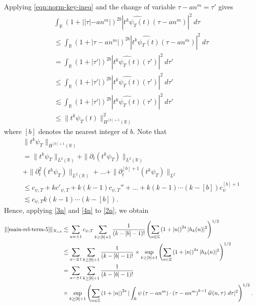 \documentclass[12pt,reqno]{amsart}
\numberwithin{equation}{section}  %
\numberwithin{figure}{section}
\newcommand{\rr}{\mathbb{R}}
\newcommand{\zz}{\mathbb{Z}}
\newcommand{\wh}{\widehat}
\newcommand{\p}{\partial}
\theoremstyle{plain}
\theoremstyle{definition}
\theoremstyle{remark}
\begin{document}
%
%
Applying \eqref{eqn:norm-key-ineq} and the change
of variable $\tau - an^{m } = \tau'$
gives
%
%
\begin{equation}
	\label{3n}
	\begin{split}
		& \int_\rr \left( 1 + | |\tau| - an^{m } | \right)^{2b} | \wh{t^{k}
		\psi_{T}(t)}\left( \tau - an^{m } \right) |^2 \ d \tau
    \\
    & \le \int_\rr \left( 1 + | \tau - an^{m } | \right)^{2b} | \wh{t^{k}
		\psi_{T}(t)}\left( \tau - an^{m } \right) |^2 \ d \tau
		\\
    & = \int_\rr \left( 1 + |\tau'| \right)^{2b} | \wh{t^k \psi_{T}(t)}(\tau') |^2 \
		d \tau'
		\\
    & \le \int_\rr \left( 1 + |\tau'| \right)^{2b} | \wh{t^k \psi_{T}(t)}(\tau')
		|^2 \ d \tau'
		\\
    & \lesssim \int_\rr \left( 1 + | \tau' | \right)^{2b}| \wh{t^{k}
		\psi_{T}(t)}(\tau') |^2 \ d \tau'
		\\
    & \le \|t^k \psi_{T}(t) \|_{H^{[b] + 1}(\rr)}^2
	\end{split}
\end{equation}
%
where $[b]$ denotes the nearest integer of $b$. Note that
%
%
\begin{equation}
	\label{4n}
	\begin{split}
    & \|t^k \psi_{T} \|_{H^{[b] +1}(\rr)}
		\\
    & = \|t^k \psi_{T}\|_{L^2(\rr)} + \|\p_t (t^k \psi_{T} )
    \|_{L^2(\rr)} 
    \\
    & + \| \p_{t}^{2} (t^{k} \psi_{T}) \|_{L^{2}(\rr)} + \ldots + \|
    \p_{t}^{[b] + 1} (t^{k} \psi_{T})\|_{L^{2}}
    \\
    & \le c_{\psi, T} + k c'_{\psi, T} + k (k -1) c_{\psi, T}'' + \ldots +
    k(k-1) \cdots (k - [b]) c_{\psi}^{[b] + 1}
    \\
    & \lesssim c_{\psi, T} k(k-1) \cdots (k - [b]).
	\end{split}
\end{equation}
%
%
Hence, applying \eqref{3n} and \eqref{4n} to \eqref{2n}, we obtain
%
\begin{equation}
	\label{5n}
	\begin{split}
		\|\eqref{main-rel-term-5} \|_{X_{s,b}}
		& \lesssim \sum_{a = \pm 1}
    c_{\psi, T}\sum_{k \ge [b] +1} \frac{1}{(k-[b] - 1)!} \left( \sum_{n \in \zz} \left (1 + |n| \right )^{2s} | h_k(n) |^2 
		\right)^{1/2}
		\\
		& \lesssim  \sum_{a = \pm 1} \sum_{k \ge [b] +1} \frac{1}{(k-[b] - 1)!}
    \times \sup_{k \ge [b] + 1} \left( \sum_{n \in \zz} \left (1 + |n| \right )^{2s} | 
		h_k(n) |^2 \right)^{1/2}
		\\
		& = \sum_{a = \pm 1}\sum_{k \ge [b] +1} \frac{1}{(k-[b] - 1)!}
    \\
    & \times \sup_{k \ge [b] + 1} 
		\left( \sum_{n \in \zz} \left (1 + |n| \right )^{2s} |\int_\rr 
		\psi\left( \tau - an^{m } \right) \cdot \left( \tau - an^{m } 
    \right)^{k -1} \wh{w}(n, \tau) \ d \tau|^{2} \right)^{1/2}.
    \end{split}
\end{equation}
\end{document}

